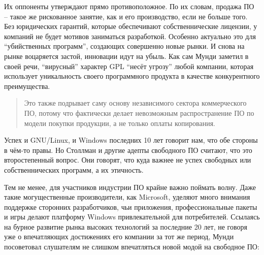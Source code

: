 Их оппоненты утверждают прямо противоположное. По их словам, продажа ПО -- такое же рискованное занятие, как и его производство, если не больше того. Без юридических гарантий, которые обеспечивают собственнические лицензии, у компаний не будет мотивов заниматься разработкой. Особенно актуально это для \enquote{убийственных программ}, создающих совершенно новые рынки.  И снова на рынке воцаряется застой, инновации идут на убыль. Как сам Мунди заметил в своей речи, \enquote{вирусный} характер GPL \enquote{несёт угрозу} любой компании, которая использует уникальность своего программного продукта в качестве конкурентного преимущества. 

\begin{quote}
Это также подрывает саму основу независимого сектора коммерческого ПО, потому что фактически делает невозможным распространение ПО по модели покупки продукции, а не только оплаты копирования.
\end{quote}

Успех и GNU/Linux, и Windows последних 10 лет говорит нам, что обе стороны в чём-то правы. Но Столлман и другие адепты свободного ПО считают, что это второстепенный вопрос. Они говорят, что куда важнее не успех свободных или собственнических программ, а их этичность.

Тем не менее, для участников индустрии ПО крайне важно поймать волну. Даже такие могущественные производители, как Microsoft, уделяют много внимания поддержке сторонних разработчиков, чьи приложения, профессиональные пакеты и игры делают платформу Windows привлекательной для потребителей. Ссылаясь на бурное развитие рынка высоких технологий за последние 20 лет, не говоря уже о впечатляющих достижениях его компании за тот же период, Мунди посоветовал слушателям не слишком впечатляться новой модой на свободное ПО:

